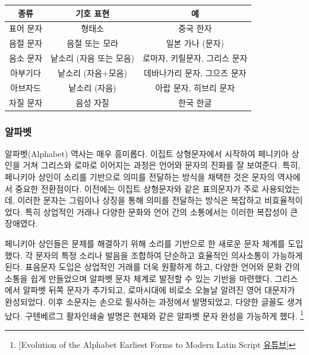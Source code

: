 \documentclass[
  letterpaper,
]{book}
\begin{document}
\begin{longtable}[]{@{}ccc@{}}
\toprule\noalign{}
\textbf{종류} & \textbf{기호 표현} & \textbf{예} \\
\midrule\noalign{}
\endhead
\bottomrule\noalign{}
\endlastfoot
표어 문자 & 형태소 & 중국 한자 \\
음절 문자 & 음절 또는 모라 & 일본 가나 (문자) \\
음소 문자 & 낱소리 (자음 또는 모음) & 로마자, 키릴문자, 그리스 문자 \\
아부기다 & 낱소리 (자음+모음) & 데바나가리 문자, 그으즈 문자 \\
아브자드 & 낱소리 (자음) & 아랍 문자, 히브리 문자 \\
자질 문자 & 음성 자질 & 한국 한글 \\
\end{longtable}

\hypertarget{uxc54cuxd30cuxbcb3}{%
\subsubsection{알파벳}\label{uxc54cuxd30cuxbcb3}}

알파벳(Alphabet) 역사는 매우 흥미롭다. 이집트 상형문자에서 시작하여
페니키아 상인을 거쳐 그리스와 로마로 이어지는 과정은 언어와 문자의
진화를 잘 보여준다. 특히, 페니키아 상인이 소리를 기반으로 의미를
전달하는 방식을 채택한 것은 문자의 역사에서 중요한 전환점이다. 이전에는
이집트 상형문자와 같은 표의문자가 주로 사용되었는데, 이러한 문자는
그림이나 상징을 통해 의미를 전달하는 방식은 복잡하고 비효율적이었다.
특히 상업적인 거래나 다양한 문화와 언어 간의 소통에서는 이러한 복잡성이
큰 장애였다.

페니키아 상인들은 문제를 해결하기 위해 소리를 기반으로 한 새로운 문자
체계를 도입했다. 각 문자의 특정 소리나 발음을 조합하여 단순하고 효율적인
의사소통이 가능하게 된다. 표음문자 도입은 상업적인 거래를 더욱 원활하게
하고, 다양한 언어와 문화 간의 소통을 쉽게 만들었으며 알파벳 문자 체계로
발전할 수 있는 기반을 마련했다. 그리스에서 알파벳 뒤쪽 문자가 추가되고,
로마시대에 비로소 오늘날 알려진 영어 대문자가 완성되었다. 이후 소문자는
손으로 필사하는 과정에서 발명되었고, 다양한 글꼴도 생겨났다. 구텐베르그
활자인쇄술 발명은 현재와 같은 알파벳 문자 완성을 가능하게 했다.
\footnote{{[}Evolution of the Alphabet \textbar{} Earliest Forms to
  Modern Latin Script
  \href{https://www.youtube.com/watch?v=3kGuN8WIGNc}{유튜브}{]}}
\end{document}
